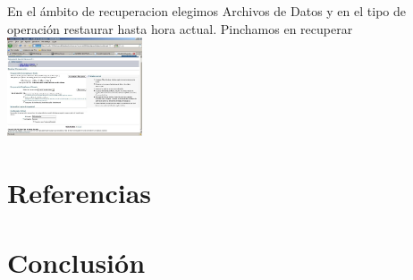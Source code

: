 \documentclass[a4paper,twocolumn,10pt]{article}
\begin{document}
En el \'ambito de recuperacion elegimos Archivos de Datos y en el tipo de operaci\'on restaurar hasta hora actual. Pinchamos en recuperar
\includegraphics[width=0.3\textwidth]{./Imagenes/eje8.jpg}

      
\section{Referencias}
\section{Conclusi\'on}
\end{document}
